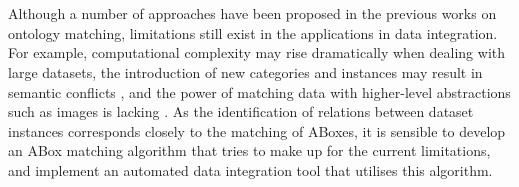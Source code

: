 \documentclass[a4paper,12pt,twoside]{article}
\begin{document}
\\\\
Although a number of approaches have been proposed in the previous works on ontology matching, limitations still exist in the applications in data integration. For example, computational complexity may rise dramatically when dealing with large datasets, the introduction of new categories and instances may result in semantic conflicts \cite{shvaiko2011ontology}, and the power of matching data with higher-level abstractions such as images is lacking \cite{claramunt2020ontologies}. As the identification of relations between dataset instances corresponds closely to the matching of ABoxes, it is sensible to develop an ABox matching algorithm that tries to make up for the current limitations, and implement an automated data integration tool that utilises this algorithm.


\end{document}
